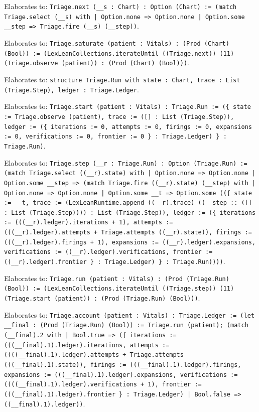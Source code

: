 \documentclass[11pt]{article}
\begin{document}
\noindent Elaborates to: \texttt{Triage.next (\_\_s : Chart) : Option (Chart) := (match Triage.select (\_\_s) with | Option.none => Option.none | Option.some \_\_step => Triage.fire (\_\_s) (\_\_step))}.\par
\noindent Elaborates to: \texttt{Triage.saturate (patient : Vitals) : (Prod (Chart) (Bool)) := (LexLeanCollections.iterateUntil ((Triage.next)) (11) (Triage.observe (patient)) : (Prod (Chart) (Bool)))}.\par
\noindent Elaborates to: \texttt{structure Triage.Run with state : Chart, trace : List (Triage.Step), ledger : Triage.Ledger}.\par
\noindent Elaborates to: \texttt{Triage.start (patient : Vitals) : Triage.Run := (\{ state := Triage.observe (patient), trace := ([] : List (Triage.Step)), ledger := (\{ iterations := 0, attempts := 0, firings := 0, expansions := 0, verifications := 0, frontier := 0 \} : Triage.Ledger) \} : Triage.Run)}.\par
\noindent Elaborates to: \texttt{Triage.step (\_\_r : Triage.Run) : Option (Triage.Run) := (match Triage.select ((\_\_r).state) with | Option.none => Option.none | Option.some \_\_step => (match Triage.fire ((\_\_r).state) (\_\_step) with | Option.none => Option.none | Option.some \_\_t => Option.some ((\{ state := \_\_t, trace := (LexLeanRuntime.append ((\_\_r).trace) ((\_\_step :: ([] : List (Triage.Step)))) : List (Triage.Step)), ledger := (\{ iterations := (((\_\_r).ledger).iterations + 1), attempts := (((\_\_r).ledger).attempts + Triage.attempts ((\_\_r).state)), firings := (((\_\_r).ledger).firings + 1), expansions := ((\_\_r).ledger).expansions, verifications := ((\_\_r).ledger).verifications, frontier := ((\_\_r).ledger).frontier \} : Triage.Ledger) \} : Triage.Run))))}.\par
\noindent Elaborates to: \texttt{Triage.run (patient : Vitals) : (Prod (Triage.Run) (Bool)) := (LexLeanCollections.iterateUntil ((Triage.step)) (11) (Triage.start (patient)) : (Prod (Triage.Run) (Bool)))}.\par
\noindent Elaborates to: \texttt{Triage.account (patient : Vitals) : Triage.Ledger := (let \_\_final : (Prod (Triage.Run) (Bool)) := Triage.run (patient); (match (\_\_final).2 with | Bool.true => (\{ iterations := (((\_\_final).1).ledger).iterations, attempts := ((((\_\_final).1).ledger).attempts + Triage.attempts (((\_\_final).1).state)), firings := (((\_\_final).1).ledger).firings, expansions := (((\_\_final).1).ledger).expansions, verifications := ((((\_\_final).1).ledger).verifications + 1), frontier := (((\_\_final).1).ledger).frontier \} : Triage.Ledger) | Bool.false => ((\_\_final).1).ledger))}.\par
\end{document}
